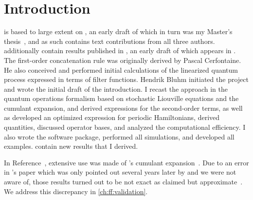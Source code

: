 \chapter{Introduction}\label{ch:ff:introduction}
\begin{partcontribs}
    \Thispart is based to large extent on , an early draft of which in turn was my Master's thesis~, and as such contains text contributions from all three authors.
     additionally contain results published in , an early draft of which appears in .
    The first-order concatenation rule was originally derived by Pascal Cerfontaine.
    He also conceived and performed initial calculations of the linearized quantum process expressed in terms of filter functions.
    Hendrik Bluhm initiated the project and wrote the initial draft of the introduction.
    I recast the approach in the quantum operations formalism based on stochastic Liouville equations and the cumulant expansion, and derived expressions for the second-order terms, as well as developed an optimized expression for periodic Hamiltonians, derived quantities, discussed operator bases, and analyzed the computational efficiency.
    I also wrote the software package, performed all simulations, and developed all examples.
     contain new results that I derived.
\end{partcontribs}
\begin{authornote}
    In Reference~\cite{Hangleiter2021}, extensive use was made of \citeauthor{Kubo1962}'s cumulant expansion~\cite{Kubo1962}.
    Due to an error in \citeauthor{Kubo1962}'s paper which was only pointed out several years later by \citet{Fox1976} and we were not aware of, those results turned out to be not exact as claimed but approximate~.
    We address this discrepancy in \cref{ch:ff:validation}.
\end{authornote}
